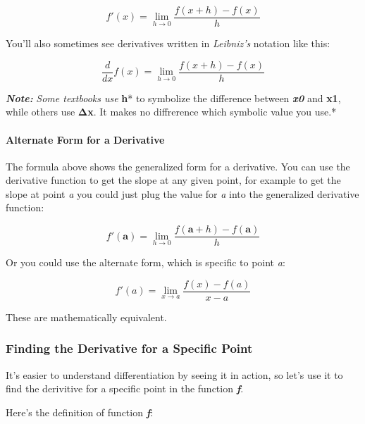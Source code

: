 \documentclass[11pt]{article}
\begin{document}
\begin{equation}f'(x) = \lim_{h \to 0} \frac{f(x + h) - f(x)}{h} \end{equation}

You'll also sometimes see derivatives written in \emph{Leibniz's}
notation like this:

\begin{equation}\frac{d}{dx}f(x) = \lim_{h \to 0} \frac{f(x + h) - f(x)}{h} \end{equation}

\textbf{\emph{Note:}} \emph{Some textbooks use }\textbf{h}* to symbolize
the difference between \textbf{\emph{x0}} and \textbf{x1}, while others
use \textbf{Δx}. It makes no diffrerence which symbolic value you use.*

    \paragraph{Alternate Form for a
Derivative}\label{alternate-form-for-a-derivative}

The formula above shows the generalized form for a derivative. You can
use the derivative function to get the slope at any given point, for
example to get the slope at point \emph{a} you could just plug the value
for \emph{a} into the generalized derivative function:

\begin{equation}f'(\textbf{a}) = \lim_{h \to 0} \frac{f(\textbf{a} + h) - f(\textbf{a})}{h} \end{equation}

Or you could use the alternate form, which is specific to point
\emph{a}:

\begin{equation}f'(a) = \lim_{x \to a} \frac{f(x) - f(a)}{x - a} \end{equation}

These are mathematically equivalent.

    \subsubsection{Finding the Derivative for a Specific
Point}\label{finding-the-derivative-for-a-specific-point}

It's easier to understand differentiation by seeing it in action, so
let's use it to find the derivitive for a specific point in the function
\textbf{\emph{f}}.

Here's the definition of function \textbf{\emph{f}}:
\end{document}

